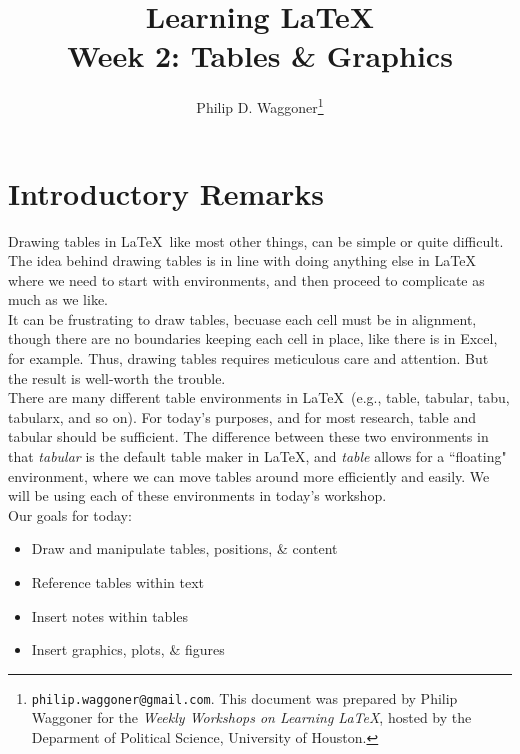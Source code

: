 \documentclass[11pt]{article}
\newcommand{\forceindent}{\leavevmode{\parindent=1.5em\indent}} %
\begin{document}
	
	\title{Learning \LaTeX \\
		\vspace{1cm}
	\large Week 2: Tables \& Graphics \\ %
		\vspace{1cm}}
	\author{Philip D. Waggoner\footnote{{\texttt{philip.waggoner@gmail.com}}. This document was prepared by Philip Waggoner for the \textit{Weekly Workshops on Learning \LaTeX}, hosted by the Deparment of Political Science, University of Houston.}}
	\date{ } %
	\maketitle

\newpage

\tableofcontents

\newpage

\section{Introductory Remarks}
	
\forceindent Drawing tables in \LaTeX\, like most other things, can be simple or quite difficult. The idea behind drawing tables is in line with doing anything else in \LaTeX\, where we need to start with environments, and then proceed to complicate as much as we like. \\

It can be frustrating to draw tables, becuase each cell must be in alignment, though there are no boundaries keeping each cell in place, like there is in Excel, for example. Thus, drawing tables requires meticulous care and attention. But the result is well-worth the trouble. \\

There are many different table environments in \LaTeX\ (e.g., table, tabular, tabu, tabularx, and so on). For today's purposes, and for most research, table and tabular should be sufficient. The difference between these two environments in that \textit{tabular} is the default table maker in \LaTeX, and \textit{table} allows for a ``floating" environment, where we can move tables around more efficiently and easily. We will be using each of these environments in today's workshop. \\

Our goals for today:

\begin{itemize}
	\item Draw and manipulate tables, positions, \& content
	\item Reference tables within text
	\item Insert notes within tables
	\item Insert graphics, plots, \& figures
\end{itemize}
\end{document}
